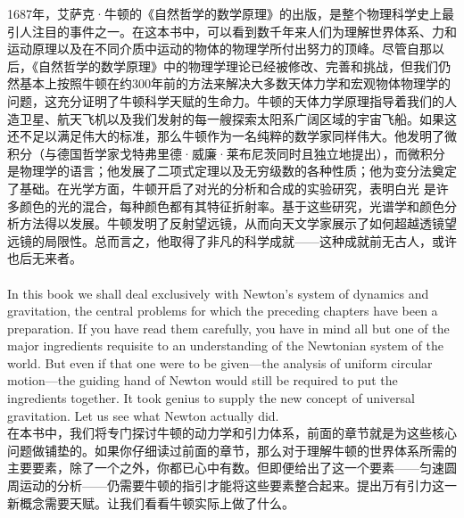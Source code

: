 \documentclass{article}
\begin{document}
1687年，艾萨克·牛顿的《自然哲学的数学原理》的出版，是整个物理科学史上最引人注目的事件之一。在这本书中，可以看到数千年来人们为理解世界体系、力和运动原理以及在不同介质中运动的物体的物理学所付出努力的顶峰。尽管自那以后，《自然哲学的数学原理》中的物理学理论已经被修改、完善和挑战，但我们仍然基本上按照牛顿在约300年前的方法来解决大多数天体力学和宏观物体物理学的问题，这充分证明了牛顿科学天赋的生命力。牛顿的天体力学原理指导着我们的人造卫星、航天飞机以及我们发射的每一艘探索太阳系广阔区域的宇宙飞船。如果这还不足以满足伟大的标准，那么牛顿作为一名纯粹的数学家同样伟大。他发明了微积分（与德国哲学家戈特弗里德·威廉·莱布尼茨同时且独立地提出），而微积分是物理学的语言；他发展了二项式定理以及无穷级数的各种性质；他为变分法奠定了基础。在光学方面，牛顿开启了对光的分析和合成的实验研究，表明白光 是许多颜色的光的混合，每种颜色都有其特征折射率。基于这些研究，光谱学和颜色分析方法得以发展。牛顿发明了反射望远镜，从而向天文学家展示了如何超越透镜望远镜的局限性。总而言之，他取得了非凡的科学成就——这种成就前无古人，或许也后无来者。 \\

\\
In this book we shall deal exclusively with Newton’s system of dynamics and gravitation, the central problems for which the preceding chapters have been a preparation. If you have read them carefully, you have in mind all but one of the major ingredients requisite to an understanding of the Newtonian system of the world. But even if that one were to be given—the analysis of uniform circular motion—the guiding hand of Newton would still be required to put the ingredients together. It took genius to supply the new concept of universal gravitation. Let us see what Newton actually did.\\
在本书中，我们将专门探讨牛顿的动力学和引力体系，前面的章节就是为这些核心问题做铺垫的。如果你仔细读过前面的章节，那么对于理解牛顿的世界体系所需的主要要素，除了一个之外，你都已心中有数。但即便给出了这一个要素——匀速圆周运动的分析——仍需要牛顿的指引才能将这些要素整合起来。提出万有引力这一新概念需要天赋。让我们看看牛顿实际上做了什么。\\
\end{document}
